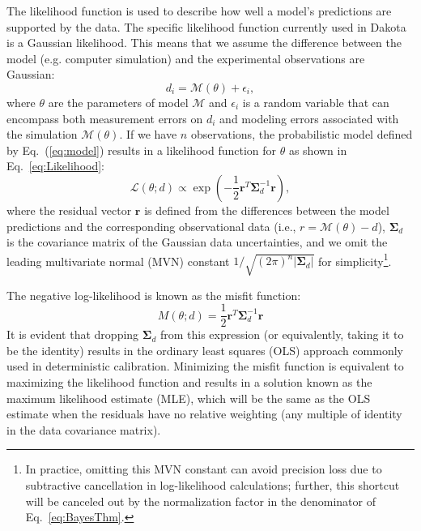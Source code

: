 The likelihood function is used to describe how well a model's
predictions are supported by the data.  
The specific likelihood function currently used in Dakota is a Gaussian
likelihood. This means that we assume the difference between the model
(e.g. computer simulation) and the experimental observations are Gaussian:
\begin{equation}
d_i = \mathcal{M}(\theta) + \epsilon_i, \label{eq:model}
\end{equation}
where $\theta$ are the parameters of model $\mathcal{M}$ and
$\epsilon_i$ is a random variable that can encompass both measurement
errors on $d_i$ and modeling errors associated with the simulation
$\mathcal{M}(\theta)$. %
If we have $n$ observations, the probabilistic model defined by 
Eq.~(\ref{eq:model}) results in a likelihood function for $\theta$ 
as shown in Eq.~\ref{eq:Likelihood}:
\begin{equation}
\mathcal{L}(\theta;d) \propto %
\exp \left(
-\frac{1}{2} \boldsymbol{r}^T \boldsymbol{\Sigma}_d^{-1} \boldsymbol{r} 
\right), \label{eq:Likelihood}
\end{equation}
where the residual vector $\boldsymbol{r}$ is defined from the
differences between the model predictions and the corresponding
observational data (i.e., $r = \mathcal{M}(\theta) - d$),
$\boldsymbol{\Sigma}_d$ is the covariance matrix of the Gaussian data
uncertainties, and we omit the leading multivariate normal (MVN)
constant $1/\sqrt{(2\pi)^n |\boldsymbol{\Sigma}_d|}$ for 
simplicity\footnote{In practice, omitting this MVN constant can avoid 
  precision loss due to subtractive cancellation in log-likelihood 
  calculations; further, this shortcut will be canceled out by the 
  normalization factor in the denominator of Eq.~\ref{eq:BayesThm}.}. 

The negative log-likelihood is known as the misfit function:
\begin{equation}
M(\theta;d) = \frac{1}{2} \boldsymbol{r}^T \boldsymbol{\Sigma}_d^{-1} 
\boldsymbol{r} %
\label{eq:misfit}
\end{equation}
It is evident that dropping $\boldsymbol{\Sigma}_d$ from this
expression (or equivalently, taking it to be the identity) results in
the ordinary least squares (OLS) approach commonly used in
deterministic calibration.  Minimizing the misfit function is
equivalent to maximizing the likelihood function and results in a
solution known as the maximum likelihood estimate (MLE), which will be
the same as the OLS estimate when the residuals have no relative
weighting (any multiple of identity in the data covariance matrix).

